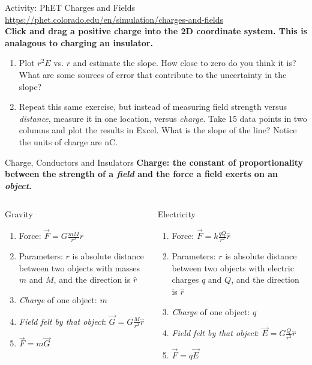 \documentclass{beamer}
\begin{document}
\begin{frame}{Activity: PhET Charges and Fields}
\small
\url{https://phet.colorado.edu/en/simulation/charges-and-fields} \\ \vspace{0.2cm}
\textbf{Click and drag a positive charge into the 2D coordinate system.  This is analagous to charging an insulator.}
\begin{enumerate}
\item Plot $r^2 E$ vs. $r$ and estimate the slope.  How close to zero do you think it is?  What are some sources of error that contribute to the uncertainty in the slope?
\item Repeat this same exercise, but instead of measuring field strength versus \textit{distance}, measure it in one location, versus \textit{charge.} Take 15 data points in two columns and plot the results in Excel.  What is the slope of the line?  Notice the units of charge are nC.
\end{enumerate}
\end{frame}

\begin{frame}{Charge, Conductors and Insulators}
\centering
\textbf{\alert{Charge: the constant of proportionality between the strength of a \textit{field} and the force a field exerts on an \textit{object}.}} \\
\hrulefill
\small
\begin{columns}[T]
\begin{column}{0.5\textwidth}
\alert{Gravity}
\begin{enumerate}
\item Force: $\vec{F} = G \frac{m M}{r^2} \hat{r}$
\item Parameters: $r$ is absolute distance between two objects with masses $m$ and $M$, and the direction is $\hat{r}$
\item \textit{Charge} of one object: $m$
\item \textit{Field felt by that object}: $\vec{G} = G \frac{M}{r^2} \hat{r}$
\item $\vec{F} = m \vec{G}$
\end{enumerate}
\end{column}
\begin{column}{0.5\textwidth}
\alert{Electricity}
\begin{enumerate}
\item Force: $\vec{F} = k \frac{q Q}{r^2} \hat{r}$
\item Parameters: $r$ is absolute distance between two objects with electric charges $q$ and $Q$, and the direction is $\hat{r}$
\item \textit{Charge} of one object: $q$
\item \textit{Field felt by that object}: $\vec{E} = G \frac{Q}{r^2} \hat{r}$
\item $\vec{F} = q \vec{E}$
\end{enumerate}
\end{column}
\end{columns}
\end{frame}
\end{document}
